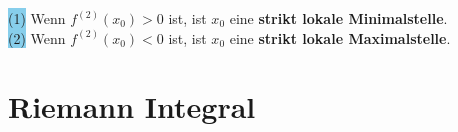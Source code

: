 \documentclass[landscape, 10pt]{article}
\begin{document}
\begin{multicols}{3}
                     \colorbox{SkyBlue}{(1)} 
                            Wenn \textcolor{NavyBlue}{
                            $f^{(2)}(x_0)>0$} ist, ist 
                            \textcolor{NavyBlue}{$x_0$}
                            eine \textbf{strikt lokale 
                            Minimalstelle}. \\
                     \colorbox{SkyBlue}{(2)} Wenn 
                            \textcolor{NavyBlue}{
                            $f^{(2)}(x_0)<0$} ist, ist
                            \textcolor{NavyBlue}{$x_0$}
                            eine \textbf{strikt lokale 
                            Maximalstelle}.

\section{Riemann Integral}

\end{multicols}
\end{document}
